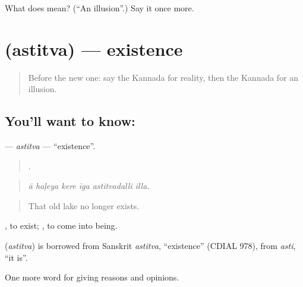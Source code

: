 \begin{tcolorbox}[breakable,colback=teal!4,colframe=teal!35!black,title={Before you move on}]
What does  mean? (\textquotedblleft{}An illusion\textquotedblright{}.) Say it once more.
\end{tcolorbox}
\section[\texorpdfstring{\kn{ಅಸ್ತಿತ್ವ} (astitva)}{ಅಸ್ತಿತ್ವ (astitva)}]{ (astitva) — existence}

\label{lesson:KA-C382-astitva}



\begin{quote}
Before the new one: say the Kannada for reality, then the Kannada for an illusion.
\end{quote}

\subsection*{You'll want to know: }
\textbf{} — \emph{astitva} — \textquotedblleft{}existence\textquotedblright{}.

\begin{quote}
     .
\end{quote}

\begin{quote}
\emph{ā haḷeya kere īga astitvadalli illa.}
\end{quote}

\begin{quote}
That old lake no longer exists.
\end{quote}

 , to exist;  , to come into being.

\begin{cousinweb}
\textbf{} (\emph{astitva}) is borrowed from Sanskrit \emph{astitva}, \textquotedblleft{}existence\textquotedblright{} (CDIAL 978), from \emph{asti}, \textquotedblleft{}it is\textquotedblright{}.
\end{cousinweb}

\begin{grammarlens}[title={What you've built}]
One more word for giving reasons and opinions.
\end{grammarlens}

